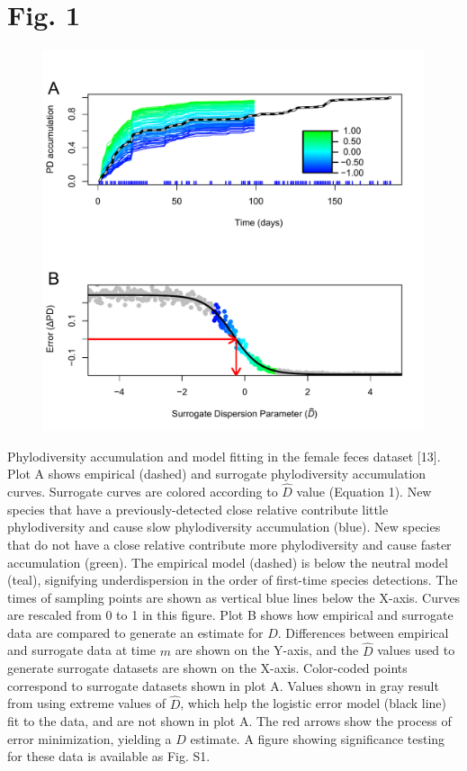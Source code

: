 \documentclass{article}
\begin{document}
\section*{Fig. 1}
\begin{figure}[ht]
	\centering
	\includegraphics[scale=0.80]{../Fig_1.pdf}
\end{figure}
Phylodiversity accumulation and model fitting in the female feces dataset [13]. Plot A shows empirical (dashed) and surrogate phylodiversity accumulation curves. Surrogate curves are colored according to \(\hat{D}\) value (Equation 1). New species that have a previously-detected close relative contribute little phylodiversity and cause slow phylodiversity accumulation (blue). New species that do not have a close relative contribute more phylodiversity and cause faster accumulation (green). The empirical model (dashed) is below the neutral model (teal), signifying underdispersion in the order of first-time species detections. The times of sampling points are shown as vertical blue lines below the X-axis. Curves are rescaled from 0 to 1 in this figure. Plot B shows how empirical and surrogate data are compared to generate an estimate for \(D\). Differences between empirical and surrogate data at time \(m\) are shown on the Y-axis, and the \(\hat{D}\) values used to generate surrogate datasets are shown on the X-axis. Color-coded points correspond to surrogate datasets shown in plot A. Values shown in gray result from using extreme values of \(\hat{D}\), which help the logistic error model (black line) fit to the data, and are not shown in plot A. The red arrows show the process of error minimization, yielding a \(D\) estimate. A figure showing significance testing for these data is available as Fig. S1.
%
\newpage
%
%
\end{document}
